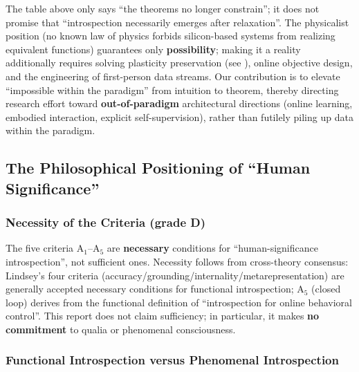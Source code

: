 \begin{remark}
The table above only says ``the theorems no longer constrain''; it does not promise that
``introspection necessarily emerges after relaxation''. The physicalist position (no known law
of physics forbids silicon-based systems from realizing equivalent
functions\cite{chalmers-2023-conscious, butlin-2023-conscious}) guarantees only
\textbf{possibility}; making it a reality additionally requires solving plasticity
preservation (see \cite{joudaki-2025-plasticity}), online objective design, and the
engineering of first-person data streams. Our contribution is to elevate
``impossible within the paradigm'' from intuition to theorem, thereby directing research effort
toward \textbf{out-of-paradigm} architectural directions (online learning, embodied
interaction, explicit self-supervision), rather than futilely piling up data within the
paradigm.
\end{remark}

\subsection{The Philosophical Positioning of ``Human Significance''}

\subsubsection{Necessity of the Criteria (grade D)}

The five criteria $\mathrm{A}_1$--$\mathrm{A}_5$ are \textbf{necessary} conditions for
``human-significance introspection'', not sufficient ones. Necessity follows from
cross-theory consensus: Lindsey's four
criteria\cite{lindsey-2026-introspection} (accuracy/grounding/internality/metarepresentation)
are generally accepted necessary conditions for functional introspection; $\mathrm{A}_5$
(closed loop) derives from the functional definition of ``introspection for online behavioral
control''\cite{kammerer-frankish-2023}. This report does not claim sufficiency; in
particular, it makes \textbf{no commitment} to qualia or phenomenal consciousness.

\subsubsection{Functional Introspection versus Phenomenal Introspection}

